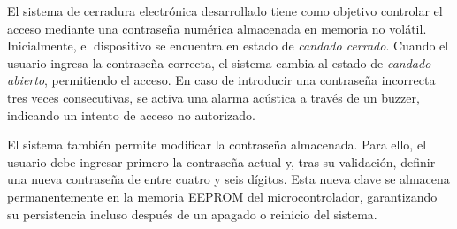 







El sistema de cerradura electrónica desarrollado tiene como objetivo controlar el acceso mediante una contraseña numérica almacenada en memoria no volátil. Inicialmente, el dispositivo se encuentra en estado de \textit{candado cerrado}. Cuando el usuario ingresa la contraseña correcta, el sistema cambia al estado de \textit{candado abierto}, permitiendo el acceso. En caso de introducir una contraseña incorrecta tres veces consecutivas, se activa una alarma acústica a través de un buzzer, indicando un intento de acceso no autorizado.

El sistema también permite modificar la contraseña almacenada. Para ello, el usuario debe ingresar primero la contraseña actual y, tras su validación, definir una nueva contraseña de entre cuatro y seis dígitos. Esta nueva clave se almacena permanentemente en la memoria EEPROM del microcontrolador, garantizando su persistencia incluso después de un apagado o reinicio del sistema.

